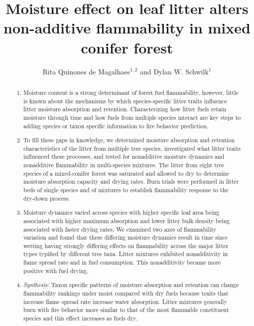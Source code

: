 \documentclass[letterpaper,12pt]{article}
\title{Moisture effect on leaf litter alters non-additive flammability in mixed conifer forest}
\author{Rita Quinones de Magalhaes$^{1,2}$ and Dylan W. Schwilk$^1$}
\begin{document}
\maketitle

\begin{abstract}
  \noindent \begin{enumerate}
    
      \item Moisture content is a strong determinant of forest fuel
    flammability, however, little is known about the mechanisms by which
    species-specific litter traits influence litter moisture absorption and
    retention. Characterizing how litter fuels retain moisture through time and
    how fuels from multiple species interact are key steps to adding species or
    taxon specific information to fire behavior prediction.

      \item To fill these gaps in knowledge, we determined moisture absorption
    and retention characteristics of the litter from multiple tree species,
    investigated what litter traits influenced these processes, and tested for
    nonadditive moisture dynamics and nonadditive flammability in multi-species
    mixtures. The litter from eight tree species of a mixed-conifer forest was
    saturated and allowed to dry to determine moisture absorption capacity and
    drying rates. Burn trials were performed in litter beds of single species
    and of mixtures to establish flammability response to the dry-down process.
    
      \item Moisture dynamics varied across species with higher specific leaf
    area being associated with higher maximum absorption and lower litter bulk
    density being associated with faster drying rates. We examined two axes of
    flammability variation and found that these differing moisture dynamics
    result in time since wetting having strongly differing effects on
    flammability across the major litter types typified by different tree taxa.
    Litter mixtures exhibited nonadditivity in flame spread rate and
    in fuel consumption. This nonadditivity became more positive with fuel
    drying.
    
      \item \emph{Synthesis:} Taxon specific patterns of moisture absorption
    and retention can change flammability rankings under moist compared with
    dry fuels because traits that increase flame spread rate increase water
    absorption. Litter mixtures generally burn with fire behavior more similar
    to that of the most flammable constituent species and this effect increases
    as fuels dry.
    
  \end{enumerate}
\end{abstract}
\end{document}
